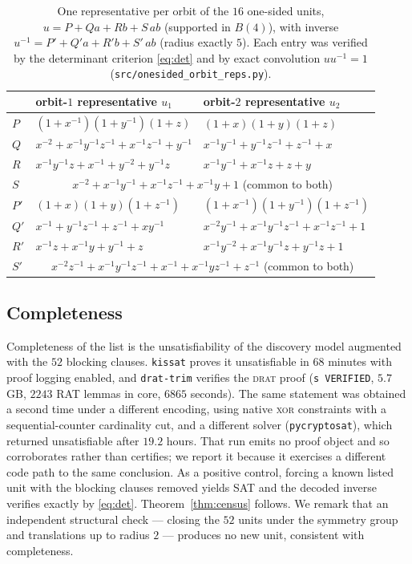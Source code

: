 \documentclass[11pt]{amsart}
\theoremstyle{definition}
\newcommand{\Ball}[1]{B(#1)}
\begin{document}
\begin{table}[ht]
\centering\small
\renewcommand{\arraystretch}{1.25}
\begin{tabular}{@{}lll@{}}
\toprule
 & orbit-$1$ representative $u_1$ & orbit-$2$ representative $u_2$\\
\midrule
$P$ & $(1+x^{-1})(1+y^{-1})(1+z)$ & $(1+x)(1+y)(1+z)$\\
$Q$ & $x^{-2}+x^{-1}y^{-1}z^{-1}+x^{-1}z^{-1}+y^{-1}$
    & $x^{-1}y^{-1}+y^{-1}z^{-1}+z^{-1}+x$\\
$R$ & $x^{-1}y^{-1}z+x^{-1}+y^{-2}+y^{-1}z$
    & $x^{-1}y^{-1}+x^{-1}z+z+y$\\
$S$ & \multicolumn{2}{c}{$x^{-2}+x^{-1}y^{-1}+x^{-1}z^{-1}+x^{-1}y+1$
     \quad (common to both)}\\
\midrule
$P'$ & $(1+x)(1+y)(1+z^{-1})$ & $(1+x^{-1})(1+y^{-1})(1+z^{-1})$\\
$Q'$ & $x^{-1}+y^{-1}z^{-1}+z^{-1}+xy^{-1}$
     & $x^{-2}y^{-1}+x^{-1}y^{-1}z^{-1}+x^{-1}z^{-1}+1$\\
$R'$ & $x^{-1}z+x^{-1}y+y^{-1}+z$
     & $x^{-1}y^{-2}+x^{-1}y^{-1}z+y^{-1}z+1$\\
$S'$ & \multicolumn{2}{c}{$x^{-2}z^{-1}+x^{-1}y^{-1}z^{-1}+x^{-1}+x^{-1}yz^{-1}+z^{-1}$
     \quad (common to both)}\\
\bottomrule
\end{tabular}
\medskip
\caption{One representative per orbit of the $16$ one-sided units,
$u=P+Qa+Rb+S\,ab$ (supported in $\Ball4$), with inverse
$u^{-1}=P'+Q'a+R'b+S'\,ab$ (radius exactly $5$). Each entry was verified by
the determinant criterion \eqref{eq:det} and by exact convolution
$uu^{-1}=1$ (\texttt{src/onesided\_orbit\_reps.py}).}
\label{tab:orbitreps}
\end{table}

\subsection{Completeness}
Completeness of the list is the unsatisfiability of the discovery model
augmented with the $52$ blocking clauses. \texttt{kissat} proves it
unsatisfiable in $68$ minutes with proof logging enabled, and
\texttt{drat-trim} verifies the \textsc{drat} proof (\texttt{s VERIFIED},
$5.7$\,GB, $2243$ RAT lemmas in core, $6865$ seconds). The same statement was
obtained a second time under a different encoding, using native \textsc{xor}
constraints with a sequential-counter cardinality cut, and a different solver
(\texttt{pycryptosat}), which returned unsatisfiable after $19.2$ hours. That
run emits no proof object and so corroborates rather than certifies; we report
it because it exercises a different code path to the same conclusion.
As a positive control, forcing a known listed unit with the blocking clauses
removed yields SAT and the decoded inverse verifies exactly by \eqref{eq:det}.
Theorem~\ref{thm:census} follows. We remark that an independent structural
check --- closing the $52$ units under the symmetry group and translations up
to radius $2$ --- produces no new unit, consistent with completeness.
\end{document}

